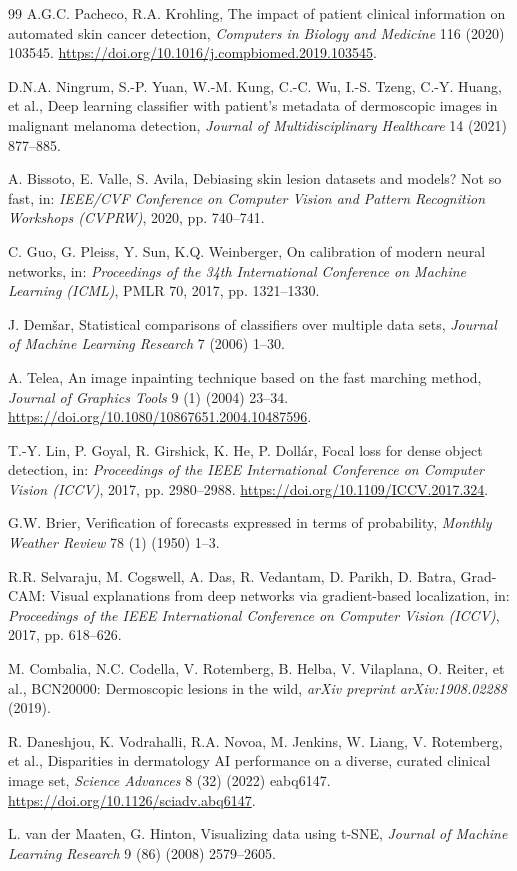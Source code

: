 \documentclass[11pt,a4paper]{article}
\begin{document}
\begin{thebibliography}{99}
A.G.C. Pacheco, R.A. Krohling, The impact of patient clinical information on automated skin cancer detection, \textit{Computers in Biology and Medicine} 116 (2020) 103545. \url{https://doi.org/10.1016/j.compbiomed.2019.103545}.

D.N.A. Ningrum, S.-P. Yuan, W.-M. Kung, C.-C. Wu, I.-S. Tzeng, C.-Y. Huang, et al., Deep learning classifier with patient's metadata of dermoscopic images in malignant melanoma detection, \textit{Journal of Multidisciplinary Healthcare} 14 (2021) 877--885.

A. Bissoto, E. Valle, S. Avila, Debiasing skin lesion datasets and models? Not so fast, in: \textit{IEEE/CVF Conference on Computer Vision and Pattern Recognition Workshops (CVPRW)}, 2020, pp. 740--741.

C. Guo, G. Pleiss, Y. Sun, K.Q. Weinberger, On calibration of modern neural networks, in: \textit{Proceedings of the 34th International Conference on Machine Learning (ICML)}, PMLR 70, 2017, pp. 1321--1330.

J. Dem{\v{s}}ar, Statistical comparisons of classifiers over multiple data sets, \textit{Journal of Machine Learning Research} 7 (2006) 1--30.

A. Telea, An image inpainting technique based on the fast marching method, \textit{Journal of Graphics Tools} 9 (1) (2004) 23--34. \url{https://doi.org/10.1080/10867651.2004.10487596}.

T.-Y. Lin, P. Goyal, R. Girshick, K. He, P. Doll{\'a}r, Focal loss for dense object detection, in: \textit{Proceedings of the IEEE International Conference on Computer Vision (ICCV)}, 2017, pp. 2980--2988. \url{https://doi.org/10.1109/ICCV.2017.324}.

G.W. Brier, Verification of forecasts expressed in terms of probability, \textit{Monthly Weather Review} 78 (1) (1950) 1--3.

R.R. Selvaraju, M. Cogswell, A. Das, R. Vedantam, D. Parikh, D. Batra, Grad-CAM: Visual explanations from deep networks via gradient-based localization, in: \textit{Proceedings of the IEEE International Conference on Computer Vision (ICCV)}, 2017, pp. 618--626.

M. Combalia, N.C. Codella, V. Rotemberg, B. Helba, V. Vilaplana, O. Reiter, et al., BCN20000: Dermoscopic lesions in the wild, \textit{arXiv preprint arXiv:1908.02288} (2019).

R. Daneshjou, K. Vodrahalli, R.A. Novoa, M. Jenkins, W. Liang, V. Rotemberg, et al., Disparities in dermatology AI performance on a diverse, curated clinical image set, \textit{Science Advances} 8 (32) (2022) eabq6147. \url{https://doi.org/10.1126/sciadv.abq6147}.

L. van der Maaten, G. Hinton, Visualizing data using t-SNE, \textit{Journal of Machine Learning Research} 9 (86) (2008) 2579--2605.

\end{thebibliography}
\end{document}
